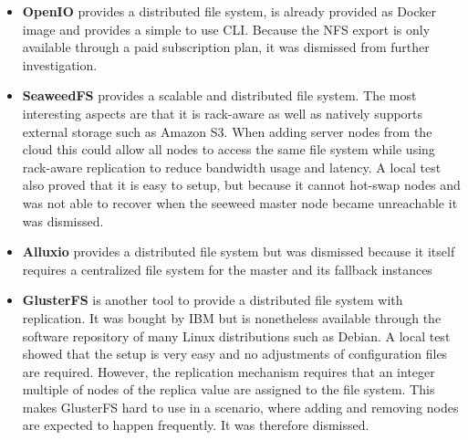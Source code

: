 \begin{itemize}
	\item \textbf{OpenIO}\cite{openio:main}\label{openio} provides a distributed file system, is already provided as Docker image and provides a simple to use CLI. Because the NFS export is only available through a paid subscription plan, it was dismissed from further investigation.
	\item \textbf{SeaweedFS}\cite{seeweedfs:main}\label{seaweedfs} provides a scalable and distributed file system. The most interesting aspects are that it is rack-aware as well as natively supports external storage such as Amazon S3. When adding server nodes from the cloud this could allow all nodes to access the same file system while using rack-aware replication to reduce bandwidth usage and latency. A local test also proved that it is easy to setup, but because it cannot hot-swap nodes and was not able to recover when the seeweed master node became unreachable it was dismissed.
	\item \textbf{Alluxio}\cite{alluxio:main}\label{alluxio} provides a distributed file system but was dismissed because it itself requires a centralized file system for the master and its fallback instances
	\item \textbf{GlusterFS}\cite{glusterfs:main}\label{glusterfs} is another tool to provide a distributed file system with replication. It was bought by IBM but is nonetheless available through the software repository of many Linux distributions such as Debian. A local test showed that the setup is very easy and no adjustments of configuration files are required. However, the replication mechanism requires that an integer multiple of nodes of the replica value are assigned to the file system. This makes GlusterFS hard to use in a scenario, where adding and removing nodes are expected to happen frequently. It was therefore dismissed.
\end{itemize}

